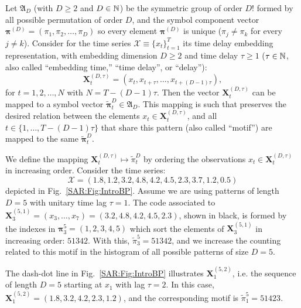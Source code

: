 Let ${\mathfrak A}_{D}$ (with $D \geq 2$ and $D \in {\Bbb N}$) be the symmetric group of order $D!$ formed by all 
possible permutation of order $D$, and the symbol component vector 
${\bm \pi}^{(D)} = (\pi_1, \pi_2, \dots, \pi_D)$ so every element ${\bm \pi}^{(D)}$ is unique 
($\pi_j \neq \pi_k$ for every $j \neq k$). 
Consider for the time series ${\mathcal X} \equiv \{x_t\}_{t=1}^{T}$ its time delay embedding representation,
with embedding dimension $D \geq 2$ and time delay $\tau \geq 1$ ($\tau \in {\Bbb N}$, also called ``embedding time,'' ``time delay'', or ``delay''):
\begin{equation} 
\label{SAR:eq:time-delay}
{\mathbf X}^{(D,\tau)}_t =( x_t,x_{t+\tau},\dots,x_{t+(D-1)\tau} ) ,
\end{equation} 
for $t = 1,2,\dots,N$ with $N = T-(D-1) \tau$.
Then the vector ${\mathbf X}^{(D,\tau)}_t$ can be mapped to a symbol vector ${ \widetilde{\bm \pi}}_t^D \in {\mathfrak A}_{D}$. 
This mapping is such that preserves the desired relation between the elements 
$x_t  \in {\mathbf X}^{(D,\tau)}_t$, and all $t \in \{1,\dots,T-(D-1)\tau\}$ that share this pattern (also called ``motif'') are mapped to the same 
${\widetilde{\bm \pi}}_t^{D}$.

We define the mapping ${\mathbf X}_t^{(D,\tau)} \mapsto {\widetilde{\pi}}_t^{D}$ by ordering the observations $x_t \in {\mathbf X}_t^{(D,\tau)}$ in increasing order.
Consider the time series:
\begin{equation}
    \mathcal X = (1.8, 1.2, 3.2, 4.8, 4.2, 4.5, 2.3, 3.7, 1.2, 0.5)
    \label{eq:series}
\end{equation}
depicted in Fig.~\ref{SAR:Fig:IntroBP}.
Assume we are using patterns of length $D=5$ with unitary time lag $\tau=1$.
The code associated to $\mathbf X_{3}^{(5,1)}=(x_3,\dots,x_7)=(3.2, 4.8, 4.2, 4.5, 2.3)$, shown in black, is formed by the indexes in $\bm\pi_3^{5}=(1,2,3,4,5)$ which sort the elements of $\mathbf X_{3}^{(5,1)}$ in increasing order: $51342$.
With this, $\widetilde{\pi}_3^{5} = 51342$, and we increase the counting related to this motif in the histogram of all possible patterns of size $D=5$.

The dash-dot line in Fig.~\ref{SAR:Fig:IntroBP} illustrates $\mathbf X_{1}^{(5,2)}$, i.e. the sequence of length $D=5$ starting at $x_1$ with lag $\tau=2$.
In this case, $\mathbf X_{1}^{(5,2)}= (1.8, 3.2, 4.2, 2.3, 1.2)$, and the corresponding motif is $\widetilde{\pi}_1^{5}=51423$.

